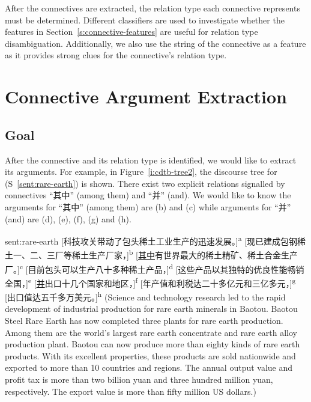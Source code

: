 After the connectives are extracted, the relation type each connective represents
must be determined. Different classifiers are used to investigate whether the features in
Section~\ref{s:connective-features} are useful for relation type disambiguation.
Additionally, we also use the string of the connective as a feature as it provides strong
clues for the connective's relation type.

\section{Connective Argument Extraction}

\subsection{Goal}

After the connective and its relation type is identified, we would like to extract
its arguments. For example, in Figure~\ref{i:cdtb-tree2}, the discourse tree
for (S~\ref{sent:rare-earth}) is shown. There exist two explicit relations signalled by
connectives ``其中'' (among them) and ``并'' (and). We would like to know the
arguments for ``其中'' (among them) are (b) and (c) while arguments for ``并'' (and) are
(d), (e), (f), (g) and (h).



\begin{sent}{sent:rare-earth}{}
    [科技攻关带动了包头稀土工业生产的迅速发展。]\textsuperscript{a}
    [现已建成包钢稀土一、二、三厂等稀土生产厂家，]\textsuperscript{b}
    [\underline{其中}有世界最大的稀土精矿、稀土合金生产厂。]\textsuperscript{c}
    [目前包头可以生产八十多种稀土产品，]\textsuperscript{d}
    [这些产品以其独特的优良性能畅销全国，]\textsuperscript{e}
    [\underline{并}出口十几个国家和地区，]\textsuperscript{f}
    [年产值和利税达二十多亿元和三亿多元，]\textsuperscript{g}
    [出口值达五千多万美元。]\textsuperscript{h}
    (Science and technology research led to the rapid development of industrial production
    for rare earth minerals in Baotou. Baotou Steel Rare Earth has now completed three
    plants for rare earth production. Among them are the world's largest rare earth
    concentrate and rare earth alloy production plant. Baotou can now produce more than
    eighty kinds of rare earth products. With its excellent properties, these products
    are sold nationwide and exported to more than 10 countries and regions.
    The annual output value and profit tax is more
    than two billion yuan and three hundred million yuan, respectively.
    The export value is more than fifty million US dollars.)
\end{sent}

